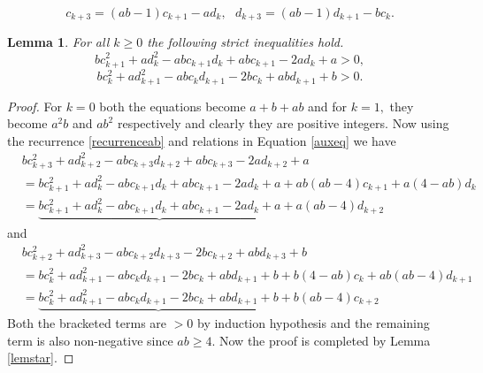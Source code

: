 \documentclass[10pt,a4paper]{amsart}
\newtheorem{lem}{Lemma}
\begin{document}
\begin{equation}\label{auxeq}
    c_{k+3}=(ab-1)c_{k+1}-ad_k,\ \ \ d_{k+3}=(ab-1)d_{k+1}-bc_k.
\end{equation}

\begin{lem}\label{lem2}
    For all $k\geq 0$ the following strict inequalities hold.
    \begin{equation}\label{funnyeq00}
        bc_{k+1}^2+ad_{k}^2-abc_{k+1}d_{k}+abc_{k+1}-2ad_{k}+a> 0,
    \end{equation}
    \begin{equation}\label{funnyeq01}
        bc_k^2+ad_{k+1}^2-abc_kd_{k+1}-2bc_k+abd_{k+1}+b> 0.
    \end{equation}
\end{lem}

\begin{proof}
    For $k=0$ both the equations become $a+b+ab$ and  for $k=1,$ they become $a^2b$ and $ab^2$ respectively and clearly they are positive integers. Now using the recurrence \ref{recurrenceab} and relations in Equation \ref{auxeq} we have 
    \begin{align*}
        & bc_{k+3}^2+ad_{k+2}^2-abc_{k+3}d_{k+2}+abc_{k+3}-2ad_{k+2}+a\\
        &=bc_{k+1}^2+ad_{k}^2-abc_{k+1}d_{k}+abc_{k+1}-2ad_{k}+a+ab(ab-4)c_{k+1}+a(4-ab)d_{k}\\
        &=\underbrace{bc_{k+1}^2+ad_{k}^2-abc_{k+1}d_{k}+abc_{k+1}-2ad_{k}+a}+a(ab-4)d_{k+2}
    \end{align*}
     and 
     \begin{align*}
        &bc_{k+2}^2+ad_{k+3}^2-abc_{k+2}d_{k+3}-2bc_{k+2}+abd_{k+3}+b\\
        &=bc_k^2+ad_{k+1}^2-abc_kd_{k+1}-2bc_k+abd_{k+1}+b+b(4-ab)c_{k}+ab(ab-4)d_{k+1}\\
        &=\underbrace{bc_k^2+ad_{k+1}^2-abc_kd_{k+1}-2bc_k+abd_{k+1}+b}+b(ab-4)c_{k+2}
    \end{align*}
    Both the bracketed terms are $>0$ by induction hypothesis and the remaining term is also non-negative since $ab\geq 4.$ Now the proof is completed by Lemma \ref{lemstar}.
\end{proof}
\end{document}
